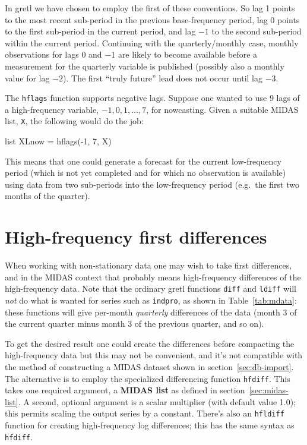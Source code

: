 In gretl we have chosen to employ the first of these
conventions. So lag 1 points to the most recent sub-period in the
previous base-frequency period, lag 0 points to the first sub-period
in the current period, and lag $-1$ to the second sub-period within
the current period. Continuing with the quarterly/monthly case,
monthly observations for lags 0 and $-1$ are likely to become
available before a measurement for the quarterly variable is published
(possibly also a monthly value for lag $-2$). The first ``truly
future'' lead does not occur until lag $-3$.

The \texttt{hflags} function supports negative lags. Suppose one
wanted to use 9 lags of a high-frequency variable,
$-1, 0, 1,\ldots, 7$, for nowcasting. Given a suitable MIDAS list,
\texttt{X}, the following would do the job:
\begin{code}
list XLnow = hflags(-1, 7, X)
\end{code}

This means that one could generate a forecast for the current
low-frequency period (which is not yet completed and for which no
observation is available) using data from two sub-periods into the
low-frequency period (e.g.\ the first two months of the quarter).

\section{High-frequency first differences}

When working with non-stationary data one may wish to take first
differences, and in the MIDAS context that probably means
high-frequency differences of the high-frequency data. Note that the
ordinary gretl functions \texttt{diff} and \texttt{ldiff} will
\textit{not} do what is wanted for series such as \texttt{indpro}, as
shown in Table~\ref{tab:mdata}: these functions will give per-month
\textit{quarterly} differences of the data (month 3 of the current
quarter minus month 3 of the previous quarter, and so on).

To get the desired result one could create the differences before
compacting the high-frequency data but this may not be convenient, and
it's not compatible with the method of constructing a MIDAS dataset
shown in section~\ref{sec:db-import}. The alternative is to employ the
specialized differencing function \texttt{hfdiff}. This takes one
required argument, a \textbf{MIDAS list} as defined in
section~\ref{sec:midas-list}. A second, optional argument is a scalar
multiplier (with default value 1.0); this permits scaling the output
series by a constant. There's also an \texttt{hfldiff} function for
creating high-frequency log differences; this has the same syntax as
\texttt{hfdiff}.

